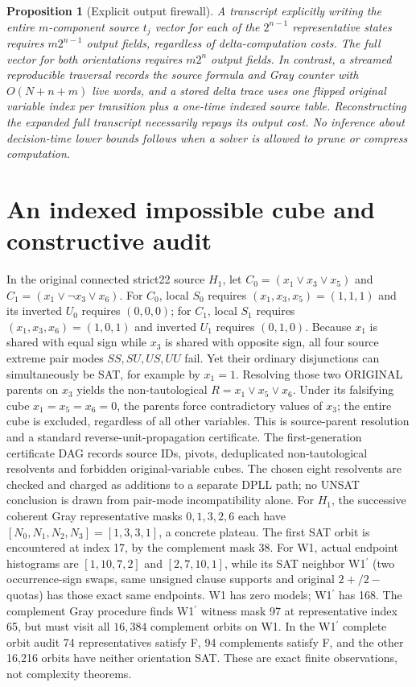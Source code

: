 \documentclass[10pt]{article}
\newtheorem{proposition}{Proposition}
\begin{document}
\begin{proposition}[Explicit output firewall]
A transcript explicitly writing the entire $m$-component source $t_j$ vector for each of the $2^{n-1}$ representative states requires $m2^{n-1}$ output fields, regardless of delta-computation costs. The full vector for both orientations requires $m2^n$ output fields. In contrast, a streamed reproducible traversal records the source formula and Gray counter with $O(N+n+m)$ live words, and a stored delta trace uses one flipped original variable index per transition plus a one-time indexed source table. Reconstructing the expanded full transcript necessarily repays its output cost. No inference about decision-time lower bounds follows when a solver is allowed to prune or compress computation.
\end{proposition}
\section{An indexed impossible cube and constructive audit}
In the original connected strict22 source $H_1$, let $C_0=(x_1\vee x_3\vee x_5)$ and $C_1=(x_1\vee\neg x_3\vee x_6)$. For $C_0$, local $S_0$ requires $(x_1,x_3,x_5)=(1,1,1)$ and its inverted $U_0$ requires $(0,0,0)$; for $C_1$, local $S_1$ requires $(x_1,x_3,x_6)=(1,0,1)$ and inverted $U_1$ requires $(0,1,0)$. Because $x_1$ is shared with equal sign while $x_3$ is shared with opposite sign, all four source extreme pair modes $SS,SU,US,UU$ fail. Yet their ordinary disjunctions can simultaneously be SAT, for example by $x_1=1$.
Resolving those two ORIGINAL parents on $x_3$ yields the non-tautological $R=x_1\vee x_5\vee x_6$. Under its falsifying cube $x_1=x_5=x_6=0$, the parents force contradictory values of $x_3$; the entire cube is excluded, regardless of all other variables. This is source-parent resolution and a standard reverse-unit-propagation certificate. The first-generation certificate DAG records source IDs, pivots, deduplicated non-tautological resolvents and forbidden original-variable cubes. The chosen eight resolvents are checked and charged as additions to a separate DPLL path; no UNSAT conclusion is drawn from pair-mode incompatibility alone.
For $H_1$, the successive coherent Gray representative masks $0,1,3,2,6$ each have $[N_0,N_1,N_2,N_3]=[1,3,3,1]$, a concrete plateau. The first SAT orbit is encountered at index 17, by the complement mask $38$. For W1, actual endpoint histograms are $[1,10,7,2]$ and $[2,7,10,1]$, while its SAT neighbor W1$^\prime$ (two occurrence-sign swaps, same unsigned clause supports and original $2+/2-$ quotas) has those exact same endpoints. W1 has zero models; W1$^\prime$ has 168. The complement Gray procedure finds W1$^\prime$ witness mask 97 at representative index 65, but must visit all $16{,}384$ complement orbits on W1. In the W1$^\prime$ complete orbit audit 74 representatives satisfy F, 94 complements satisfy F, and the other 16,216 orbits have neither orientation SAT. These are exact finite observations, not complexity theorems.
\end{document}
